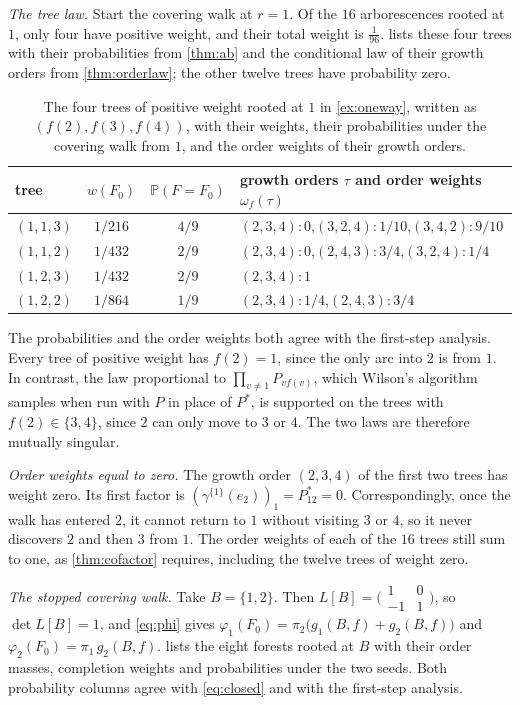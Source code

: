 \documentclass[onefignum,onetabnum,nohypdvips]{siamart250211}
\numberwithin{theorem}{section}
\numberwithin{equation}{section}
\newcommand{\pr}{\mathbb{P}}
\begin{document}
\begin{example}
\emph{The tree law.} Start the covering walk at $r=1$. Of the $16$
arborescences rooted at $1$, only four have positive weight, and their
total weight is $\tfrac1{96}$.  lists these four
trees with their probabilities from \cref{thm:ab} and the conditional
law of their growth orders from \cref{thm:orderlaw}; the other twelve
trees have probability zero.

\begin{table}[ht]
\caption{The four trees of positive weight rooted at $1$ in
\cref{ex:oneway}, written as $(f(2),f(3),f(4))$, with their weights,
their probabilities under the covering walk from $1$, and the order
weights of their growth orders.}\label{tab:oneway-trees}
\centering
\small
\begin{tabular}{@{}lccl@{}}
\toprule
tree & $w(F_0)$ & $\pr(F=F_0)$ & growth orders $\tau$ and order weights $\omega_f(\tau)$\\
\midrule
$(1,1,3)$ & $1/216$ & $4/9$ & $(2,3,4)\colon 0$,\quad $(3,2,4)\colon1/10$,\quad $(3,4,2)\colon9/10$\\
$(1,1,2)$ & $1/432$ & $2/9$ & $(2,3,4)\colon 0$,\quad $(2,4,3)\colon3/4$,\quad $(3,2,4)\colon1/4$\\
$(1,2,3)$ & $1/432$ & $2/9$ & $(2,3,4)\colon 1$\\
$(1,2,2)$ & $1/864$ & $1/9$ & $(2,3,4)\colon1/4$,\quad $(2,4,3)\colon3/4$\\
\bottomrule
\end{tabular}
\end{table}

The probabilities and the order weights both agree with the first-step
analysis. Every tree of positive weight has $f(2)=1$, since the only arc into
$2$ is from $1$. In contrast, the law proportional to
$\prod_{v\ne1}P_{vf(v)}$, which Wilson's algorithm samples when run
with $P$ in place of $P^{*}$, is supported on the
trees with $f(2)\in\{3,4\}$, since $2$ can only move to $3$ or $4$.
The two laws are therefore mutually singular.

\emph{Order weights equal to zero.} The growth order $(2,3,4)$ of the
first two trees has weight zero. Its first factor is
$(\gamma^{\{1\}}(e_2))_1=P^{*}_{12}=0$. Correspondingly, once the walk
has entered $2$, it cannot return to $1$ without visiting $3$ or $4$,
so it never discovers $2$ and then $3$ from $1$. The order weights of
each of the $16$ trees still sum to one, as \cref{thm:cofactor}
requires, including the twelve trees of weight zero.

\emph{The stopped covering walk.} Take $B=\{1,2\}$. Then
$L[B]=\big(\begin{smallmatrix}1&0\\-1&1\end{smallmatrix}\big)$, so
$\det L[B]=1$, and \eqref{eq:phi} gives
$\varphi_1(F_0)=\pi_2\big(g_1(B,f)+g_2(B,f)\big)$ and
$\varphi_2(F_0)=\pi_1\,g_2(B,f)$.  lists the
eight forests rooted at $B$ with their order masses, completion weights
and probabilities under the two seeds. Both probability columns agree
with \eqref{eq:closed} and with the first-step analysis.


\end{example}
\end{document}
